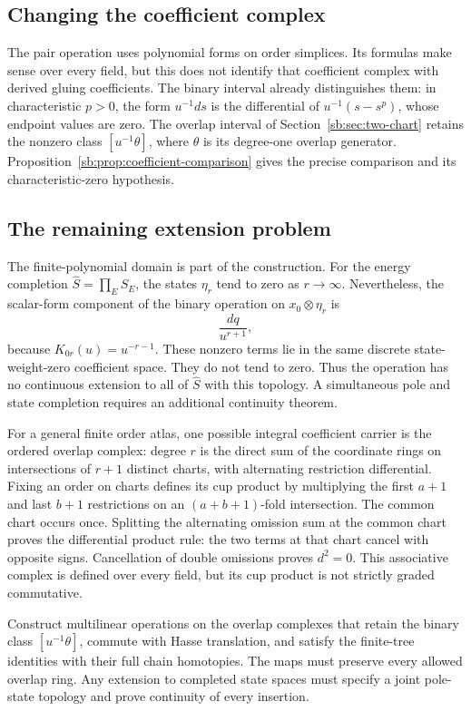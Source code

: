 \subsection*{Changing the coefficient complex}

The pair operation uses polynomial forms on order simplices.
Its formulas make sense over every field, but this does not identify
that coefficient complex with derived gluing coefficients.
The binary interval already distinguishes them: in characteristic
\(p>0\), the form \(u^{-1}ds\) is the differential of
\(u^{-1}(s-s^p)\), whose endpoint values are zero.
The overlap interval of Section~\ref{sb:sec:two-chart}
retains the nonzero class \([u^{-1}\theta]\), where \(\theta\)
is its degree-one overlap generator.
Proposition~\ref{sb:prop:coefficient-comparison} gives the precise comparison
and its characteristic-zero hypothesis.

\subsection{The remaining extension problem}

The finite-polynomial domain is part of the construction.
For the energy completion \(\widehat S=\prod_ES_E\), the states
\(\eta_r\) tend to zero as \(r\to\infty\).
Nevertheless, the scalar-form component of the binary operation on
\(x_0\otimes\eta_r\) is
\[
 \frac{dq}{u^{r+1}},
\]
because \(K_{0r}(u)=u^{-r-1}\).
These nonzero terms lie in the same discrete state-weight-zero
coefficient space.  They do not tend to zero.
Thus the operation has no continuous extension to all of
\(\widehat S\) with this topology.  A simultaneous pole and
state completion requires an additional continuity theorem.

For a general finite order atlas, one possible integral coefficient
carrier is the ordered overlap complex: degree \(r\) is the
direct sum of the coordinate rings on intersections of \(r+1\)
distinct charts, with alternating restriction differential.
Fixing an order on charts defines its cup product by multiplying
the first \(a+1\) and last \(b+1\) restrictions on an
\((a+b+1)\)-fold intersection.  The common chart occurs once.
Splitting the alternating omission sum at the common chart proves
the differential product rule: the two terms at that chart cancel
with opposite signs.  Cancellation of double omissions proves \(d^2=0\).
This associative complex is defined over every field,
but its cup product is not strictly graded commutative.

\begin{problem}
Construct multilinear operations on the overlap complexes that retain
the binary class \([u^{-1}\theta]\), commute with Hasse
translation, and satisfy the finite-tree identities with their full
chain homotopies.  The maps must preserve every allowed overlap ring.
Any extension to completed state spaces must specify a joint
pole-state topology and prove continuity of every insertion.
\end{problem}

